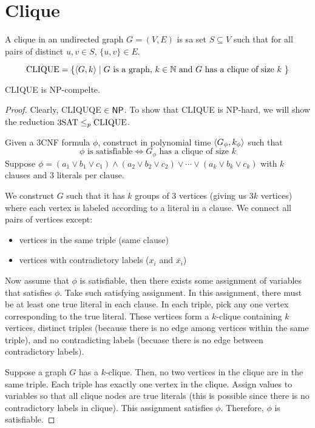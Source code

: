 \section{Clique}

A clique in an undirected graph $G=(V,E)$ is sa set $S \subseteq V$ such that for all pairs of distinct $u, v \in S$, $\{u,v\} \in E$.

$$
\mathrm{CLIQUE} = \{ \langle G,k \rangle \mid \text{$G$ is a graph, $k \in \mathbb{N}$ and $G$ has a clique of size $k$ }\}
$$

\begin{theorem}
    CLIQUE is NP-compelte.
\end{theorem}

\begin{proof}
    Clearly, CLIQUQE $\in \mathsf{NP}$. To show that CLIQUE is NP-hard, we will show the reduction $\mathrm{3SAT} \leq_p \mathrm{CLIQUE}$.

    Given a 3CNF formula $\phi$, construct in polynomial time $\langle G_{\phi},k_{\phi} \rangle$ such that
    $$
    \text{$\phi$ is satisfiable} \iff \text{$G_{\phi}$ has a clique of size $k$}
    $$
    Suppose $\phi = (a_1 \lor b_1 \lor c_1) \land (a_2 \lor b_2 \lor c_2) \lor \cdots \lor (a_k \lor b_k \lor c_k)$ with $k$ clauses and 3 literals per clause.

    We construct $G$ such that it has $k$ groups of 3 vertices (giving us $3k$ vertices) where each vertex is labeled according to a literal in a clause. We connect all pairs of vertices except:
    \begin{itemize}
        \item vertices in the same triple (same clause)
        \item vertices with contradictory labels ($x_i$ and $\overline{x_i}$)
    \end{itemize}
    Now assume that $\phi$ is satisfiable, then there exists some assignment of variables that satisfies $\phi$. Take such satisfying assignment. In this assignment, there must be at least one true literal in each clause. In each triple, pick any one vertex corresponding to the true literal. These vertices form a $k$-clique containing $k$ vertices, distinct triples (because there is no edge among vertices within the same triple), and no contradicting labels (becuase there is no edge between contradictory labels).

    Suppose a graph $G$ has a $k$-clique. Then, no two vertices in the clique are in the same triple. Each triple has exactly one vertex in the clique. Assign values to variables so that all clique nodes are true literals (this is possible since there is no contradictory labels in clique). This assignment satisfies $\phi$. Therefore, $\phi$ is satisfiable.
\end{proof}

